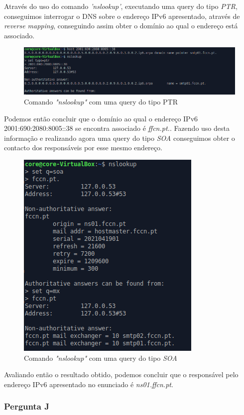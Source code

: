 \documentclass[11pt]{article}
\begin{document}
\par Através do uso do comando \textit{'nslookup'}, executando uma query do tipo \textit{PTR}, conseguimos interrogar o DNS sobre o endereço IPv6 apresentado, através de \textit{reverse mapping}, conseguindo assim obter o domínio ao qual o endereço está associado.

\begin{figure}[!htb]
    \centering
    \includegraphics[width=.8\textwidth]{images/Parte1/p1_i1.PNG}
    \caption{Comando \textit{"nslookup"} com uma query do tipo PTR}
    \label{fig:nsIPV6PTR}
\end{figure}

\par Podemos então concluir que o domínio ao qual o endereço IPv6 2001:690:2080:8005::38 se encontra associado é \textit{ffcn.pt.}. Fazendo uso desta informação e realizando agora uma query do tipo \textit{SOA} conseguimos obter o contacto dos responsáveis por esse mesmo endereço.

\begin{figure}
    \centering
    \includegraphics[width=.4\textwidth]{images/Parte1/p1_i2.PNG}
    \caption{Comando \textit{"nslookup"} com uma query do tipo \textit{SOA}}
    \label{fig:nsIPV6SOA}
\end{figure}

\par Avaliando então o resultado obtido, podemos concluir que o responsável pelo endereço IPv6 apresentado no enunciado é \textit{ns01.ffcn.pt}.

\subsubsection{Pergunta J}
\end{document}
